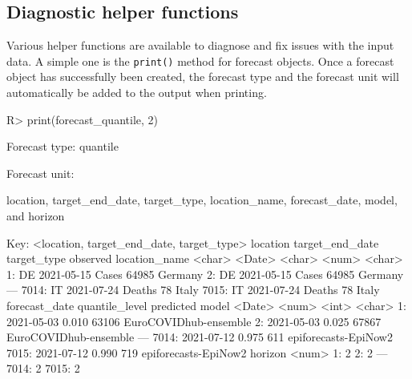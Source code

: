 \documentclass[
]{jss}
\begin{document}
\subsection{Diagnostic helper
functions}\label{diagnostic-helper-functions}

Various helper functions are available to diagnose and fix issues with
the input data. A simple one is the \texttt{print()} method for forecast
objects. Once a forecast object has successfully been created, the
forecast type and the forecast unit will automatically be added to the
output when printing.

\begin{CodeChunk}
\begin{CodeInput}
R> print(forecast_quantile, 2)
\end{CodeInput}
\begin{CodeOutput}
Forecast type: quantile
\end{CodeOutput}
\begin{CodeOutput}
Forecast unit:
\end{CodeOutput}
\begin{CodeOutput}
location, target_end_date, target_type, location_name, forecast_date,
model, and horizon
\end{CodeOutput}
\begin{CodeOutput}

Key: <location, target_end_date, target_type>
      location target_end_date target_type observed location_name
        <char>          <Date>      <char>    <num>        <char>
   1:       DE      2021-05-15       Cases    64985       Germany
   2:       DE      2021-05-15       Cases    64985       Germany
  ---                                                            
7014:       IT      2021-07-24      Deaths       78         Italy
7015:       IT      2021-07-24      Deaths       78         Italy
      forecast_date quantile_level predicted                 model
             <Date>          <num>     <int>                <char>
   1:    2021-05-03          0.010     63106 EuroCOVIDhub-ensemble
   2:    2021-05-03          0.025     67867 EuroCOVIDhub-ensemble
  ---                                                             
7014:    2021-07-12          0.975       611  epiforecasts-EpiNow2
7015:    2021-07-12          0.990       719  epiforecasts-EpiNow2
      horizon
        <num>
   1:       2
   2:       2
  ---        
7014:       2
7015:       2
\end{CodeOutput}
\end{CodeChunk}
\end{document}
